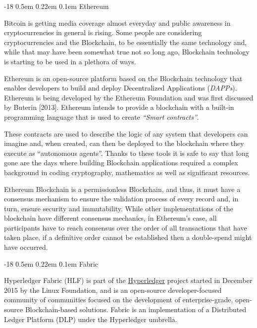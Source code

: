 \documentclass[]{llncs}
\makeatletter
\renewcommand\subsubsection{\@startsection{subsubsection}{3}{\z@}%
                       {-18\p@ \@plus -4\p@ \@minus -4\p@}%
                       {0.5em \@plus 0.22em \@minus 0.1em}%
                       {\normalfont\normalsize\bfseries\boldmath}}
\makeatother
\begin{document}
\subsubsection{Ethereum}

Bitcoin is getting media coverage almost everyday and public awareness in cryptocurrencies 
in general is rising. 
Some people are considering cryptocurrencies and the Blockchain, to be essentially the same 
technology and, while that may have been somewhat true not so long ago, Blockchain technology 
is starting to be used in a plethora of ways.

Ethereum is an open-source platform based on the Blockchain technology that enables developers 
to build and deploy Decentralized Applications (\textit{DAPPs}).
Ethereum is being developed by the Ethereum Foundation and was first discussed by Buterin [2013]. 
Ethereum intends to provide a blockchain with a built-in programming language that is used to 
create \textit{“Smart contracts”}.
\cite{Wood2017}

These contracts are used to describe the logic of any system that developers can imagine and, 
when created, can then be deployed to the blockchain where they execute as “autonomous agents”. 
Thanks to these tools it is safe to say that long gone are the days where building 
Blockchain applications required a complex background in coding cryptography, mathematics 
as well as significant resources.\cite{Wood2017,BlockGeeks2017}

Ethereum Blockchain is a permissionless Blockchain, and thus, it must have a consensus 
mechanism to ensure the validation process of every record and, in turn, ensure security 
and immutability. While other implementations of the blockchain have different consensus mechanics, 
in Ethereum’s case, all participants have to reach consensus over the order of all transactions 
that have taken place, if a definitive order cannot be established then a double-spend might have occurred.

\subsubsection{Fabric}

Hyperledger Fabric (HLF) is part of the \href{http://www.hyperledger.org/projects/fabric}{Hyperledger} 
project started in December 2015 by the Linux Foundation, and is an open-source developer-focused 
community of communities focused on the development of enterprise-grade, open-source Blockchain-based solutions. 
Fabric is an implementation of a Distributed Ledger Platform (DLP) under the Hyperledger umbrella.
\cite{Cachin2016}
\end{document}
